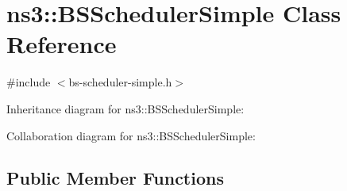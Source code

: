 \hypertarget{classns3_1_1BSSchedulerSimple}{}\section{ns3\+:\+:B\+S\+Scheduler\+Simple Class Reference}
\label{classns3_1_1BSSchedulerSimple}


{\ttfamily \#include $<$bs-\/scheduler-\/simple.\+h$>$}



Inheritance diagram for ns3\+:\+:B\+S\+Scheduler\+Simple\+:


Collaboration diagram for ns3\+:\+:B\+S\+Scheduler\+Simple\+:
\subsection*{Public Member Functions}
